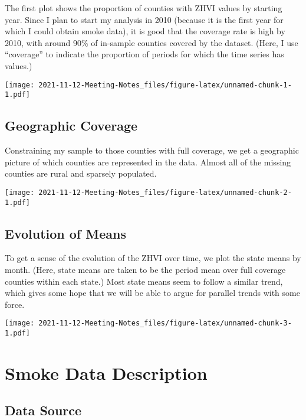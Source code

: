 \documentclass[]{article}
\begin{document}
The first plot shows the proportion of counties with ZHVI values by
starting year. Since I plan to start my analysis in 2010 (because it is
the first year for which I could obtain smoke data), it is good that the
coverage rate is high by 2010, with around 90\% of in-sample counties
covered by the dataset. (Here, I use ``coverage'' to indicate the
proportion of periods for which the time series has values.)

\texttt{[image: 2021-11-12-Meeting-Notes\_files/figure-latex/unnamed-chunk-1-1.pdf]}
\pagebreak

\subsection{Geographic Coverage}\label{geographic-coverage}

Constraining my sample to those counties with full coverage, we get a
geographic picture of which counties are represented in the data. Almost
all of the missing counties are rural and sparsely populated.

\texttt{[image: 2021-11-12-Meeting-Notes\_files/figure-latex/unnamed-chunk-2-1.pdf]}
\pagebreak

\subsection{Evolution of Means}\label{evolution-of-means}

To get a sense of the evolution of the ZHVI over time, we plot the state
means by month. (Here, state means are taken to be the period mean over
full coverage counties within each state.) Most state means seem to
follow a similar trend, which gives some hope that we will be able to
argue for parallel trends with some force.

\texttt{[image: 2021-11-12-Meeting-Notes\_files/figure-latex/unnamed-chunk-3-1.pdf]}

\section{Smoke Data Description}\label{smoke-data-description}

\subsection{Data Source}\label{data-source-1}
\end{document}
